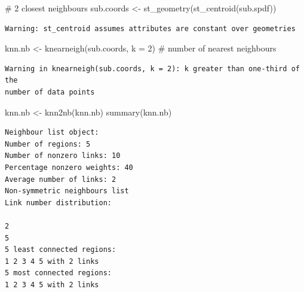 \documentclass[
  letterpaper,
]{scrbook}
\newenvironment{Shaded}{\begin{snugshade}}{\end{snugshade}}
\newcommand{\AttributeTok}[1]{\textcolor[rgb]{0.40,0.45,0.13}{#1}}
\newcommand{\CommentTok}[1]{\textcolor[rgb]{0.37,0.37,0.37}{#1}}
\newcommand{\DecValTok}[1]{\textcolor[rgb]{0.68,0.00,0.00}{#1}}
\newcommand{\FunctionTok}[1]{\textcolor[rgb]{0.28,0.35,0.67}{#1}}
\newcommand{\NormalTok}[1]{\textcolor[rgb]{0.00,0.23,0.31}{#1}}
\newcommand{\OtherTok}[1]{\textcolor[rgb]{0.00,0.23,0.31}{#1}}
\begin{document}
\begin{Shaded}
\begin{Highlighting}[]
\CommentTok{\# 2 closest neighbours}
\NormalTok{sub.coords }\OtherTok{\textless{}{-}} \FunctionTok{st\_geometry}\NormalTok{(}\FunctionTok{st\_centroid}\NormalTok{(sub.spdf))}
\end{Highlighting}
\end{Shaded}

\begin{verbatim}
Warning: st_centroid assumes attributes are constant over geometries
\end{verbatim}

\begin{Shaded}
\begin{Highlighting}[]
\NormalTok{knn.nb }\OtherTok{\textless{}{-}} \FunctionTok{knearneigh}\NormalTok{(sub.coords, }
                     \AttributeTok{k =} \DecValTok{2}\NormalTok{) }\CommentTok{\# number of nearest neighbours}
\end{Highlighting}
\end{Shaded}

\begin{verbatim}
Warning in knearneigh(sub.coords, k = 2): k greater than one-third of the
number of data points
\end{verbatim}

\begin{Shaded}
\begin{Highlighting}[]
\NormalTok{knn.nb }\OtherTok{\textless{}{-}} \FunctionTok{knn2nb}\NormalTok{(knn.nb)}
\FunctionTok{summary}\NormalTok{(knn.nb)}
\end{Highlighting}
\end{Shaded}

\begin{verbatim}
Neighbour list object:
Number of regions: 5 
Number of nonzero links: 10 
Percentage nonzero weights: 40 
Average number of links: 2 
Non-symmetric neighbours list
Link number distribution:

2 
5 
5 least connected regions:
1 2 3 4 5 with 2 links
5 most connected regions:
1 2 3 4 5 with 2 links
\end{verbatim}
\end{document}
